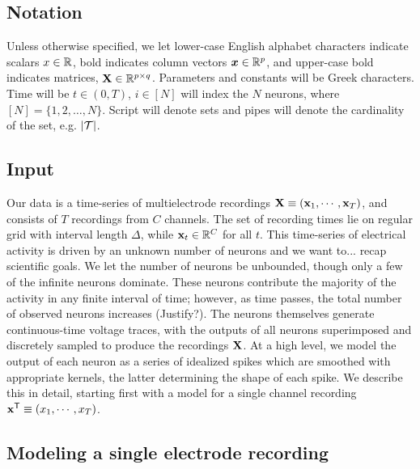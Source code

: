 

\subsection{Notation}

Unless otherwise specified, we let lower-case English alphabet characters indicate scalars $x \in \mathbb{R}$, bold indicates column vectors $\boldsymbol{x} \in \mathbb{R}^p$, and upper-case bold indicates matrices, $\mathbf{X} \in \mathbb{R}^{p \times q}$.  Parameters and constants will be Greek characters.  Time will be $t \in (0,T)$, $i \in [N]$ will index the $N$ neurons, where $[N]=\{1,2,\ldots,N\}$. Script will denote sets and pipes will denote the cardinality of the set, e.g. $|\mathcal{T}|$.  

\subsection{Input}
Our data is a time-series of multielectrode recordings $\mathbf{X} \equiv (\mathbf{x}_1, \cdots, \mathbf{x}_T)$, and consists of $T$ recordings from $C$ channels. 
The set of recording times lie on regular grid with interval length $\Delta$, while $\mathbf{x}_t \in \mathbb{R}^C$ for all $t$. 
This time-series of electrical activity is driven by an unknown number of neurons {\color{red} and we want to... recap scientific goals}. 
We let the number of neurons be unbounded, though only a few of the infinite
neurons dominate. These neurons contribute the majority of the activity in any finite interval of time; however, as time passes, the total number of 
observed neurons increases {\color{red}(Justify?)}. 
The neurons themselves generate continuous-time voltage traces, with the outputs of all neurons superimposed and discretely sampled to produce the 
recordings $\mathbf{X}$.  At a high level, we model the output of each neuron as a
series of idealized spikes which are smoothed with appropriate kernels, the latter determining the shape of each spike. 
We describe this in detail, starting first with a model for a single channel recording $\mathbf{x}^{\mathsf{T}} \equiv (x_1, \cdots, x_T)$.

\subsection{Modeling a single electrode recording}


